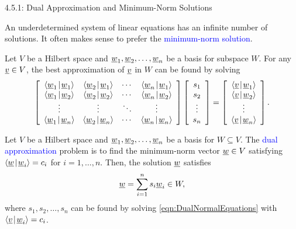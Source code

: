 \documentclass[10pt,letterpaper,english]{beamer}
\begin{document}
\begin{frame}{4.5.1: Dual Approximation and Minimum-Norm Solutions}

An underdetermined system of linear equations has an infinite number of solutions.
It often makes sense to prefer the \textcolor{blue}{minimum-norm solution}.

\vspace{3mm}

Let $V$ be a Hilbert space and $\underline{w}_1 ,\underline{w}_2 , \ldots, \underline{w}_n$ be a basis for subspace $W$.
For any $\underline{v} \in V$, the best approximation of $\underline{v}$ in $W$ can be found by solving
\begin{equation} \label{eqn:DualNormalEquations}
\left[ \begin{array}{cccc}
{\left\langle  \underline{w}_1  \mskip2mu \middle| \mskip2mu  \underline{w}_1  \right\rangle}
& {\left\langle  \underline{w}_2  \mskip2mu \middle| \mskip2mu  \underline{w}_1  \right\rangle} & \cdots
& {\left\langle  \underline{w}_n  \mskip2mu \middle| \mskip2mu  \underline{w}_1  \right\rangle} \\
{\left\langle  \underline{w}_1  \mskip2mu \middle| \mskip2mu  \underline{w}_2  \right\rangle}
& {\left\langle  \underline{w}_2  \mskip2mu \middle| \mskip2mu  \underline{w}_2  \right\rangle} & \cdots
& {\left\langle  \underline{w}_n  \mskip2mu \middle| \mskip2mu  \underline{w}_2  \right\rangle} \\
\vdots & \vdots & \ddots & \vdots \\
{\left\langle  \underline{w}_1  \mskip2mu \middle| \mskip2mu  \underline{w}_n  \right\rangle}
& {\left\langle  \underline{w}_2  \mskip2mu \middle| \mskip2mu  \underline{w}_n  \right\rangle} & \cdots
& {\left\langle  \underline{w}_n  \mskip2mu \middle| \mskip2mu  \underline{w}_n  \right\rangle}
\end{array} \right]
\left[ \begin{array}{c}
s_1 \\ s_2 \\ \vdots \\ s_n \end{array} \right]
= \left[ \begin{array}{c}
{\left\langle  \underline{v}  \mskip2mu \middle| \mskip2mu  \underline{w}_1  \right\rangle} \\
{\left\langle  \underline{v}  \mskip2mu \middle| \mskip2mu  \underline{w}_2  \right\rangle} \\ \vdots \\
{\left\langle  \underline{v}  \mskip2mu \middle| \mskip2mu  \underline{w}_n  \right\rangle} \end{array} \right] .
\end{equation}

\begin{theorem}
Let $V$ be a Hilbert space and $\underline{w}_1 ,\underline{w}_2 , \ldots, \underline{w}_n$ be a basis for $W\subseteq V$.
The \textcolor{blue}{dual approximation} problem is to find the minimum-norm vector $\underline{w}\in V$ satisfying ${\left\langle  \underline{w}  \mskip2mu \middle| \mskip2mu  \underline{w}_i  \right\rangle} = c_i$ for $i=1,\ldots,n$.
Then, the solution $\underline{w}$ satisfies \vspace{-1.5mm}
\[ \vecnot{w} = \sum_{i=1}^n s_i \vecnot{w}_i \in W, \vspace{-1.5mm} \]
where $s_1,s_2,\ldots,s_n$ can be found by solving \eqref{eqn:DualNormalEquations} with ${\left\langle  \underline{v}  \mskip2mu \middle| \mskip2mu  \underline{w}_i  \right\rangle} = c_i$.
\end{theorem}

\end{frame}
\end{document}
